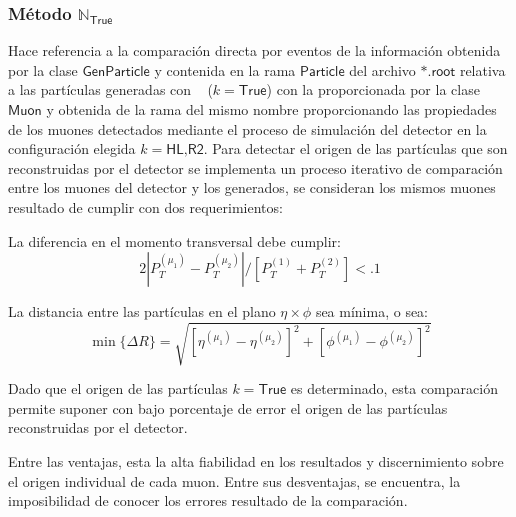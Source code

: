 \subsubsection{Método $\mathbb{N}_\textsf{True}$}
Hace referencia a la comparación directa por eventos de la información obtenida por la clase $\textsf{GenParticle}$  y contenida en la rama $\textsf{Particle}$ del archivo $\textsf{*.root}$ relativa a las partículas generadas con \MC ~ ($k=\textsf{True}$) con la proporcionada por la clase $\textsf{Muon}$ y obtenida de la rama del mismo nombre proporcionando las propiedades de los muones detectados mediante el proceso de simulación del detector en la configuración elegida $k=\textsf{HL,R2}$. %
Para detectar el origen de las partículas que son reconstruidas por el detector se implementa un proceso iterativo de comparación entre los muones del detector y los generados, se consideran los mismos muones resultado de cumplir con dos requerimientos: 
\begin{itemize_f}
\item La diferencia en el momento transversal debe cumplir:
\begin{equation}
2\left|P_T^{(\mu_1)}-P_T^{(\mu_2)}\right|/\left[P_T^{(1)}+P_T^{(2)}\right] < .1
\end{equation} 
\item La distancia entre las partículas en el plano $\eta \times \phi$ sea mínima, o sea:
\begin{equation}
\min{\{\Delta R\}} = \sqrt{\left[\eta^{(\mu_1)} - \eta^{(\mu_2)}\right]^2 + \left[\phi^{(\mu_1)} - \phi^{(\mu_2)}\right]^2}
\end{equation}
\end{itemize_f} 
Dado que el origen de las partículas $k=\textsf{True}$ es determinado, esta comparación permite suponer con bajo porcentaje de error el origen de las partículas reconstruidas por el detector.

Entre las ventajas, esta la alta fiabilidad en los resultados y discernimiento sobre el origen individual de cada muon. Entre sus desventajas, se encuentra, la imposibilidad de conocer los errores resultado de la comparación. %

